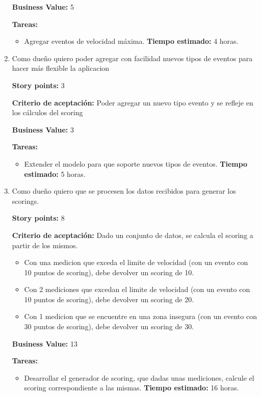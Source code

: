 \begin{enumerate}
\textbf{Business Value:} 5

\textbf{Tareas:}
	\begin{itemize}
		\item Agregar eventos de velocidad máxima.
		\newline \textbf{Tiempo estimado:} 4 horas. 
	\end{itemize}





\item Como dueño quiero poder agregar con facilidad nuevos tipos de eventos para hacer más flexible la aplicacion

\textbf{Story points:} 3

\textbf{Criterio de aceptación:}
Poder agregar un nuevo tipo evento y se refleje en los cálculos del scoring

\textbf{Business Value:} 3

\textbf{Tareas:}
	\begin{itemize}
		\item Extender el modelo para que soporte nuevos tipos de eventos.
		\newline \textbf{Tiempo estimado:} 5 horas. 
	\end{itemize}





\item Como dueño quiero que se procesen los datos recibidos para generar los scorings.

\textbf{Story points:} 8

\textbf{Criterio de aceptación:}
Dado un conjunto de datos, se calcula el scoring a partir de los mismos.
\begin{itemize}
	\item Con una medicion que exceda el limite de velocidad (con un evento con 10 puntos de scoring), debe devolver un scoring de 10.
	\item Con 2 mediciones que excedan el limite de velocidad (con un evento con 10 puntos de scoring), debe devolver un scoring de 20.
	\item Con 1 medicion que se encuentre en una zona insegura (con un evento con 30 puntos de scoring), debe devolver un scoring de 30.
\end{itemize}

\textbf{Business Value:} 13

\textbf{Tareas:}
	\begin{itemize}
		\item Desarrollar el generador de scoring, que dadas unas mediciones, calcule el scoring correspondiente a las mismas.
		\newline \textbf{Tiempo estimado:} 16 horas. 
	\end{itemize}


\end{enumerate}